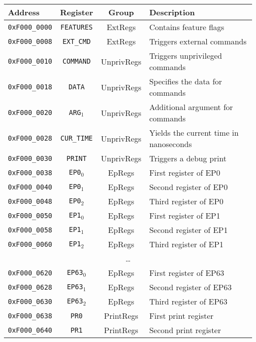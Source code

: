 \vspace{2ex}
\noindent
\begin{tabular}{ p{3cm} | c | c | l }
  \textbf{Address} & \textbf{Register} & \textbf{Group} & \textbf{Description} \\
  \hline
  \hline
  \texttt{0xF000\_0000} & \texttt{FEATURES} & ExtRegs & Contains feature flags \\
  \texttt{0xF000\_0008} & \texttt{EXT\_CMD} & ExtRegs & Triggers external commands \\
  \hline
  \hline
  \texttt{0xF000\_0010} & \texttt{COMMAND} & UnprivRegs & Triggers unprivileged commands \\
  \texttt{0xF000\_0018} & \texttt{DATA} & UnprivRegs & Specifies the data for commands \\
  \texttt{0xF000\_0020} & \texttt{ARG$_1$} & UnprivRegs & Additional argument for commands \\
  \texttt{0xF000\_0028} & \texttt{CUR\_TIME} & UnprivRegs & Yields the current time in nanoseconds \\
  \texttt{0xF000\_0030} & \texttt{PRINT} & UnprivRegs & Triggers a debug print \\
  \hline
  \hline
  \texttt{0xF000\_0038} & \texttt{EP0$_0$} & EpRegs & First register of EP0 \\
  \texttt{0xF000\_0040} & \texttt{EP0$_1$} & EpRegs & Second register of EP0 \\
  \texttt{0xF000\_0048} & \texttt{EP0$_2$} & EpRegs & Third register of EP0 \\
  \hline
  \texttt{0xF000\_0050} & \texttt{EP1$_0$} & EpRegs & First register of EP1 \\
  \texttt{0xF000\_0058} & \texttt{EP1$_1$} & EpRegs & Second register of EP1 \\
  \texttt{0xF000\_0060} & \texttt{EP1$_2$} & EpRegs & Third register of EP1 \\
  \hline
  \multicolumn{4}{c}{\dots} \\
  \hline
  \texttt{0xF000\_0620} & \texttt{EP63$_0$} & EpRegs & First register of EP63 \\
  \texttt{0xF000\_0628} & \texttt{EP63$_1$} & EpRegs & Second register of EP63 \\
  \texttt{0xF000\_0630} & \texttt{EP63$_2$} & EpRegs & Third register of EP63 \\
  \hline
  \hline
  \texttt{0xF000\_0638} & \texttt{PR0} & PrintRegs & First print register \\
  \texttt{0xF000\_0640} & \texttt{PR1} & PrintRegs & Second print register \\

\end{tabular}
